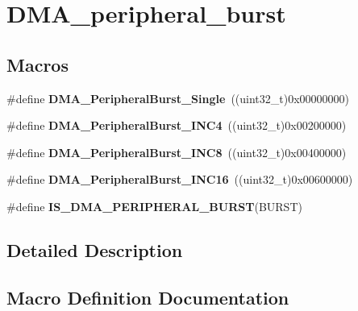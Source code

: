 \hypertarget{group___d_m_a__peripheral__burst}{}\section{D\+M\+A\+\_\+peripheral\+\_\+burst}
\label{group___d_m_a__peripheral__burst}
\subsection*{Macros}
\begin{DoxyCompactItemize}
\item 
\hypertarget{group___d_m_a__peripheral__burst_ga524cdc5efb8978b586637f35e38a850b}{}\#define {\bfseries D\+M\+A\+\_\+\+Peripheral\+Burst\+\_\+\+Single}~((uint32\+\_\+t)0x00000000)\label{group___d_m_a__peripheral__burst_ga524cdc5efb8978b586637f35e38a850b}

\item 
\hypertarget{group___d_m_a__peripheral__burst_gaa8eba5161b3927f1ffb81157f3e39b71}{}\#define {\bfseries D\+M\+A\+\_\+\+Peripheral\+Burst\+\_\+\+I\+N\+C4}~((uint32\+\_\+t)0x00200000)\label{group___d_m_a__peripheral__burst_gaa8eba5161b3927f1ffb81157f3e39b71}

\item 
\hypertarget{group___d_m_a__peripheral__burst_gaf04ba122268e0f54085ca8e45410fe69}{}\#define {\bfseries D\+M\+A\+\_\+\+Peripheral\+Burst\+\_\+\+I\+N\+C8}~((uint32\+\_\+t)0x00400000)\label{group___d_m_a__peripheral__burst_gaf04ba122268e0f54085ca8e45410fe69}

\item 
\hypertarget{group___d_m_a__peripheral__burst_ga04ff56ff0a2a5470fc2c4817be4213c2}{}\#define {\bfseries D\+M\+A\+\_\+\+Peripheral\+Burst\+\_\+\+I\+N\+C16}~((uint32\+\_\+t)0x00600000)\label{group___d_m_a__peripheral__burst_ga04ff56ff0a2a5470fc2c4817be4213c2}

\item 
\#define {\bfseries I\+S\+\_\+\+D\+M\+A\+\_\+\+P\+E\+R\+I\+P\+H\+E\+R\+A\+L\+\_\+\+B\+U\+R\+S\+T}(B\+U\+R\+S\+T)
\end{DoxyCompactItemize}


\subsection{Detailed Description}


\subsection{Macro Definition Documentation}
\hypertarget{group___d_m_a__peripheral__burst_ga7c60961178e2a32e9e364a220a8aca88}{}

